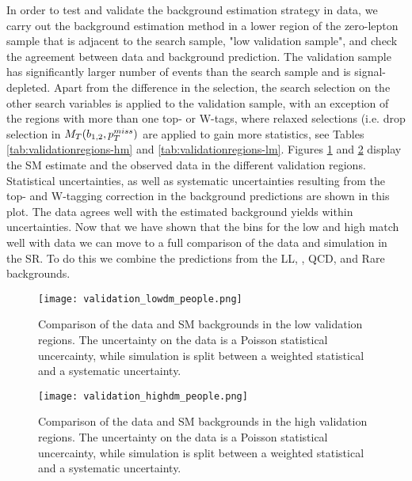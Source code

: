 In order to test and validate the background estimation strategy in data, we carry out the background estimation method in a lower \met{} region of the zero-lepton sample that is adjacent to the search sample, "low \met{} validation sample", and check the agreement between data and background prediction. The validation sample has significantly larger number of events than the search sample and is signal-depleted. Apart from the difference in the \met{} selection, the search selection on the other search variables is applied to the validation sample, with an exception of the regions with more than one top- or W-tags, where relaxed selections (i.e. drop selection in $M_T(b_{1,2},p_{T}^{miss})$ are applied to gain more statistics, see Tables \ref{tab:validationregions-hm} and \ref{tab:validationregions-lm}. Figures \ref{fig:validation-region-lm} and \ref{fig:validation-region-hm} display the SM estimate and the observed data in the different validation regions. Statistical uncertainties, as well as systematic uncertainties resulting from the top- and W-tagging correction in the background predictions are shown in this plot. The data agrees well with the estimated background yields within uncertainties. Now that we have shown that the bins for the low and high \dm{} match well with data we can move to a full comparison of the data and simulation in the SR. To do this we combine the predictions from the LL, \Znunu, QCD, and Rare backgrounds.

\begin{figure}
	\begin{center}
  \texttt{[image: validation\_lowdm\_people.png]}
	\end{center}
	\caption[LM Validation Region]{Comparison of the data and SM backgrounds in the low \dm{} validation regions. The uncertainty on the data is a Poisson statistical uncercainty, while simulation is split between a weighted statistical and a systematic uncertainty.
	 }
	\label{fig:validation-region-lm}
\end{figure}

\begin{figure}
	\begin{center}
  \texttt{[image: validation\_highdm\_people.png]}
	\end{center}
	\caption[Lost Lepton HM Control Region]{Comparison of the data and SM backgrounds in the high \dm{} validation regions. The uncertainty on the data is a Poisson statistical uncercainty, while simulation is split between a weighted statistical and a systematic uncertainty.
	 }
	\label{fig:validation-region-hm}
\end{figure}

